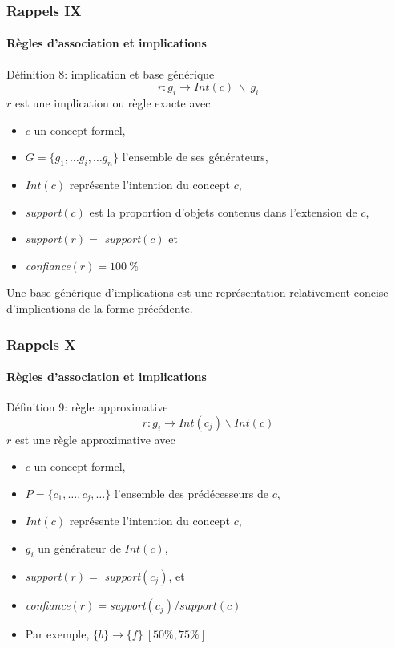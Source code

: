 \documentclass[french]{beamer}
\begin{document}
\begin{frame}
\frametitle{Rappels IX}
\framesubtitle{Règles d'association et implications}
\begin{block}{Définition 8: implication et base générique}
$$r: g_i \rightarrow Int(c)\ \backslash\ g_i $$
$r$ est une implication ou règle exacte avec
\begin{itemize}
\item $c$ un concept formel,
\item $G=\{g_1,\ldots g_i, \ldots g_n \}$ l'ensemble de ses générateurs,
\item $Int(c)$ représente l'intention du concept $c$,
\item \emph{support}$(c)$ est la proportion d'objets contenus dans l'extension de $c$,
\item \emph{support}$(r) = $ \emph{support}$(c)$ et
\item \emph{confiance}$(r) = 100\ \%$
\end{itemize}
Une base générique \parencite{Pasquier1999} d'implications est une représentation relativement concise d'implications de la forme précédente. 
\end{block}
\end{frame}

\begin{frame}
\frametitle{Rappels X}
\framesubtitle{Règles d'association et implications}
\begin{block}{Définition 9: règle approximative}
$$r: g_i \rightarrow Int(c_j)\backslash Int(c) $$
$r$ est une règle approximative avec
\begin{itemize}
\item $c$ un concept formel,
\item $P = \{c_1, \ldots, c_j, \ldots \}$ l'ensemble des prédécesseurs de $c$,
\item $Int(c)$ représente l'intention du concept $c$,
\item $g_i$ un générateur de $Int(c)$,
\item \emph{support}$(r) =$ \emph{support}$(c_j)$, et
\item  \emph{confiance}$(r) = $\emph{support}$(c_j)/support(c)$
\end{itemize}
\end{block}
\begin{itemize}
  \item Par exemple, $\{b\} \rightarrow \{f\}\ [50\%,75\%]$
\end{itemize}
\end{frame}
\end{document}
